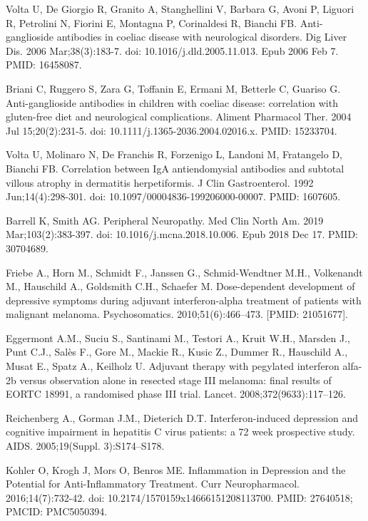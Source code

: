 \documentclass{article}
\begin{document}
\begin{thebibliography}{9}
Volta U, De Giorgio R, Granito A, Stanghellini V, Barbara G, Avoni P, Liguori R, Petrolini N, Fiorini E, Montagna P, Corinaldesi R, Bianchi FB. Anti-ganglioside antibodies in coeliac disease with neurological disorders. Dig Liver Dis. 2006 Mar;38(3):183-7. doi: 10.1016/j.dld.2005.11.013. Epub 2006 Feb 7. PMID: 16458087.

Briani C, Ruggero S, Zara G, Toffanin E, Ermani M, Betterle C, Guariso G. Anti-ganglioside antibodies in children with coeliac disease: correlation with gluten-free diet and neurological complications. Aliment Pharmacol Ther. 2004 Jul 15;20(2):231-5. doi: 10.1111/j.1365-2036.2004.02016.x. PMID: 15233704.

Volta U, Molinaro N, De Franchis R, Forzenigo L, Landoni M, Fratangelo D, Bianchi FB. Correlation between IgA antiendomysial antibodies and subtotal villous atrophy in dermatitis herpetiformis. J Clin Gastroenterol. 1992 Jun;14(4):298-301. doi: 10.1097/00004836-199206000-00007. PMID: 1607605.

Barrell K, Smith AG. Peripheral Neuropathy. Med Clin North Am. 2019 Mar;103(2):383-397. doi: 10.1016/j.mcna.2018.10.006. Epub 2018 Dec 17. PMID: 30704689.

Friebe A., Horn M., Schmidt F., Janssen G., Schmid-Wendtner M.H., Volkenandt M., Hauschild A., Goldsmith C.H., Schaefer M. Dose-dependent development of depressive symptoms during adjuvant interferon-alpha treatment of patients with malignant melanoma. Psychosomatics. 2010;51(6):466–473. [PMID: 21051677].

Eggermont A.M., Suciu S., Santinami M., Testori A., Kruit W.H., Marsden J., Punt C.J., Salès F., Gore M., Mackie R., Kusic Z., Dummer R., Hauschild A., Musat E., Spatz A., Keilholz U. Adjuvant therapy with pegylated interferon alfa-2b versus observation alone in resected stage III melanoma: final results of EORTC 18991, a randomised phase III trial. Lancet. 2008;372(9633):117–126.

Reichenberg A., Gorman J.M., Dieterich D.T. Interferon-induced depression and cognitive impairment in hepatitis C virus patients: a 72 week prospective study. AIDS. 2005;19(Suppl. 3):S174–S178.

Kohler O, Krogh J, Mors O, Benros ME. Inflammation in Depression and the Potential for Anti-Inflammatory Treatment. Curr Neuropharmacol. 2016;14(7):732-42. doi: 10.2174/1570159x14666151208113700. PMID: 27640518; PMCID: PMC5050394.


\end{thebibliography}
\end{document}
